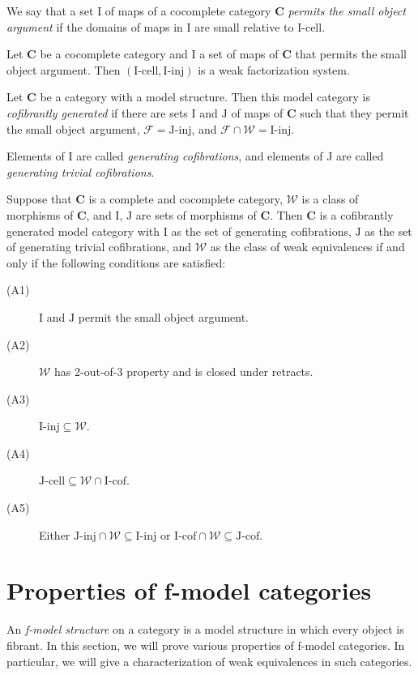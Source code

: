 \documentclass{amsart}
\theoremstyle{definition}
\newcommand{\we}{\mathcal{W}}
\newcommand{\fib}{\mathcal{F}}
\newcommand{\cat}[1]{\mathbf{#1}}
\newcommand{\C}{\cat{C}}
\newcommand{\I}{\mathrm{I}}
\newcommand{\J}{\mathrm{J}}
\newcommand{\class}[2]{#1\text{-}\mathrm{#2}}
\newcommand{\Iinj}[1][\I]{\class{#1}{inj}}
\newcommand{\Icell}[1][\I]{\class{#1}{cell}}
\newcommand{\Icof}[1][\I]{\class{#1}{cof}}
\newcommand{\Jinj}[1][]{\Iinj[\J#1]}
\newcommand{\Jcell}[1][]{\Icell[\J#1]}
\newcommand{\Jcof}[1][]{\Icof[\J#1]}
\begin{document}
We say that a set $\I$ of maps of a cocomplete category $\C$ \emph{permits the small object argument}
if the domains of maps in $\I$ are small relative to $\Icell$.

\begin{prop}
Let $\C$ be a cocomplete category and $\I$ a set of maps of $\C$ that permits the small object argument.
Then $(\Icell,\Iinj)$ is a weak factorization system.
\end{prop}

\begin{defn}
Let $\C$ be a category with a model structure. Then this model category is
\emph{cofibrantly generated} if there are sets $\I$ and $\J$ of maps of $\C$ such
that they permit the small object argument, $\fib = \Jinj$, and $\fib \cap \we = \Iinj$.

Elements of $\I$ are called \emph{generating cofibrations},
and elements of $\J$ are called \emph{generating trivial cofibrations}.
\end{defn}

\begin{prop}
Suppose that $\C$ is a complete and cocomplete category, $\we$ is a class of morphisms of $\C$, and $\I$, $\J$ are sets of morphisms of $\C$.
Then $\C$ is a cofibrantly generated model category with $\I$ as the set of generating cofibrations,
$\J$ as the set of generating trivial cofibrations, and $\we$ as the class of weak equivalences if and only if the following conditions are satisfied:
\begin{description}
\item[(A1)] $\I$ and $\J$ permit the small object argument.
\item[(A2)] $\we$ has 2-out-of-3 property and is closed under retracts.
\item[(A3)] $\Iinj \subseteq \we$.
\item[(A4)] $\Jcell \subseteq \we \cap \Icof$.
\item[(A5)] Either $\Jinj \cap \we \subseteq \Iinj$ or $\Icof \cap \we \subseteq \Jcof$.
\end{description}
\end{prop}

\section{Properties of f-model categories}

An \emph{f-model structure} on a category is a model structure in which every object is fibrant.
In this section, we will prove various properties of f-model categories.
In particular, we will give a characterization of weak equivalences in such categories.
\end{document}
